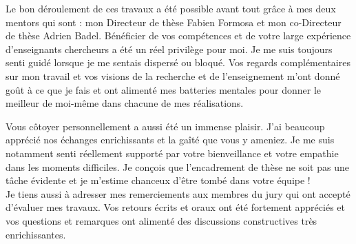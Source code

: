 Le bon déroulement de ces travaux a été possible avant tout grâce à mes deux mentors qui sont : mon Directeur de thèse Fabien Formosa et mon co-Directeur de thèse Adrien Badel. Bénéficier de vos compétences et de votre large expérience d'enseignants chercheurs a été un réel privilège pour moi. Je me suis toujours senti guidé lorsque je me sentais dispersé ou bloqué. Vos regards complémentaires sur mon travail et vos visions de la recherche et de l'enseignement m'ont donné goût à ce que je fais et ont alimenté mes batteries mentales pour donner le meilleur de moi-même dans chacune de mes réalisations.

Vous côtoyer personnellement a aussi été un immense plaisir. J'ai beaucoup apprécié nos échanges enrichissants et la gaîté que vous y ameniez. Je me suis notamment senti réellement supporté par votre bienveillance et votre empathie dans les moments difficiles. Je conçois que l'encadrement de thèse ne soit pas une tâche évidente et je m'estime chanceux d'être tombé dans votre équipe !\\

Je tiens aussi à adresser mes remerciements aux membres du jury qui ont accepté d'évaluer mes travaux. Vos retours écrits et oraux ont été fortement appréciés et vos questions et remarques ont alimenté des discussions constructives très enrichissantes. 